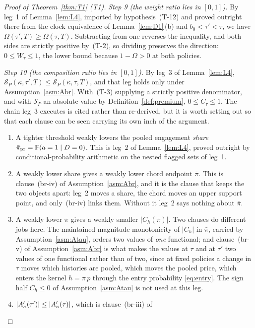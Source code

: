 \begin{proof}[Proof of Theorem~\ref{thm:T1} (T1)]
\emph{Step 9 (the weight ratio lies in $[0,1]$).} By leg~1 of Lemma~\ref{lem:L4}, imported by
hypothesis~(T-12) and proved outright there from the clock equivalence of Lemma~\ref{lem:D1}\,(b)
and $b_0 < \tau' < \tau$, we have $\Omega(\tau',T) \ge \Omega(\tau,T)$. Subtracting from one
reverses the inequality, and both sides are strictly positive by~(T-2), so dividing preserves the
direction: $0 \le W_\tau \le 1$, the lower bound because $1-\Omega > 0$ at both policies.

\emph{Step 10 (the composition ratio lies in $[0,1]$).} By leg~3 of Lemma~\ref{lem:L4},
$\mathcal S_P(\kappa,\tau',T) \le \mathcal S_P(\kappa,\tau,T)$, and that leg holds only under
Assumption~\ref{asm:Abr}. With~(T-3) supplying a strictly positive denominator, and with
$\mathcal S_P$ an absolute value by Definition~\ref{def:premium}, $0 \le C_\tau \le 1$. The chain
leg~3 executes is cited rather than re-derived, but it is worth setting out so that each clause can
be seen carrying its own inch of the argument.
\begin{enumerate}[label=(\roman*),leftmargin=2.4em,itemsep=3pt]
\item A tighter threshold weakly lowers the pooled engagement \emph{share}
  $\bar\pi_{\mathrm{pr}} = \mathbb{P}(a=1\mid D=0)$. This is leg~2 of Lemma~\ref{lem:L4}, proved outright
  by conditional-probability arithmetic on the nested flagged sets of leg~1.
\item A weakly lower share gives a weakly lower chord endpoint $\bar\pi$. This is clause~(br-iv) of
  Assumption~\ref{asm:Abr}, and it is the clause that keeps the two objects apart: leg~2 moves a
  share, the chord moves an upper support point, and only~(br-iv) links them. Without it leg~2 says
  nothing about $\bar\pi$.
\item A weakly lower $\bar\pi$ gives a weakly smaller $\lvert C_h(\bar\pi)\rvert$. Two clauses do
  different jobs here. The maintained magnitude monotonicity of $\lvert C_h\rvert$ in $\bar\pi$,
  carried by Assumption~\ref{asm:Atau}, orders two values of \emph{one} functional; and
  clause~(br-v) of Assumption~\ref{asm:Abr} is what makes the values at $\tau$ and at $\tau'$ two
  values of one functional rather than of two, since at fixed policies a change in $\tau$ moves
  which histories are pooled, which moves the pooled price, which enters the kernel
  $h = \pi\,p$ through the entry probability \eqref{eq:entry}. The sign half $C_h \le 0$ of
  Assumption~\ref{asm:Atau} is not used at this leg.
\item $\lvert A'_{\kappa}(\tau')\rvert \le \lvert A'_{\kappa}(\tau)\rvert$, which is clause~(br-iii) of

\end{enumerate}
\end{proof}
